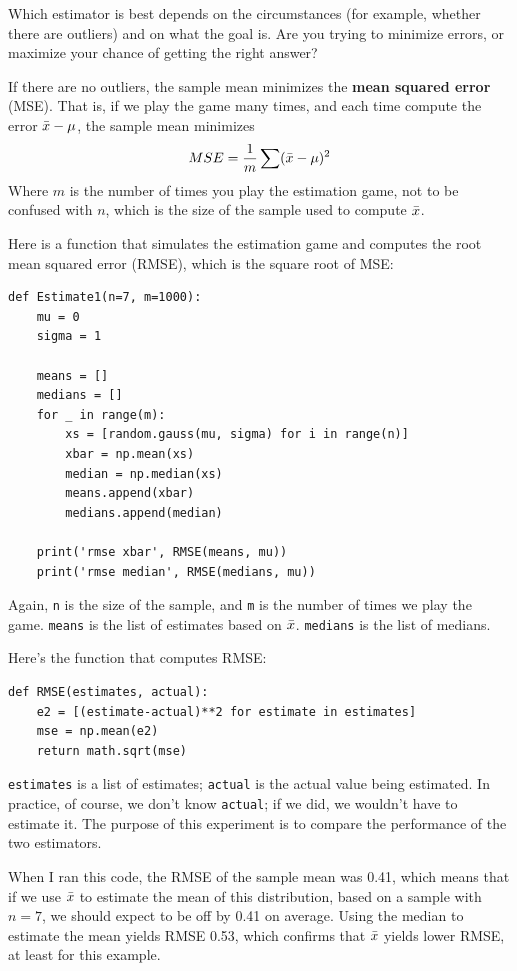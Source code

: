 \documentclass[12pt]{book}
\begin{document}
Which estimator is best depends on the circumstances (for example,
whether there are outliers) and on what the goal is.  Are you
trying to minimize errors, or maximize your chance of getting the
right answer?

If there are no outliers, the sample mean minimizes the {\bf mean squared
error} (MSE).  That is, if we play the game many times, and each time
compute the error $\bar{x} - \mu$, the sample mean minimizes
%
\[ MSE = \frac{1}{m} \sum (\bar{x} - \mu)^2 \]
%
Where $m$ is the number of times you play the estimation game, not
to be confused with $n$, which is the size of the sample used to
compute $\bar{x}$.

Here is a function that simulates the estimation game and computes
the root mean squared error (RMSE), which is the square root of
MSE:

\begin{verbatim}
def Estimate1(n=7, m=1000):
    mu = 0
    sigma = 1

    means = []
    medians = []
    for _ in range(m):
        xs = [random.gauss(mu, sigma) for i in range(n)]
        xbar = np.mean(xs)
        median = np.median(xs)
        means.append(xbar)
        medians.append(median)

    print('rmse xbar', RMSE(means, mu))
    print('rmse median', RMSE(medians, mu))
\end{verbatim}

Again, \verb"n" is the size of the sample, and \verb"m" is the
number of times we play the game.  \verb"means" is the list of
estimates based on $\bar{x}$.  \verb"medians" is the list of medians.

Here's the function that computes RMSE:

\begin{verbatim}
def RMSE(estimates, actual):
    e2 = [(estimate-actual)**2 for estimate in estimates]
    mse = np.mean(e2)
    return math.sqrt(mse)
\end{verbatim}

\verb"estimates" is a list of estimates; \verb"actual" is the
actual value being estimated.  In practice, of course, we don't
know \verb"actual"; if we did, we wouldn't have to estimate it.
The purpose of this experiment is to compare the performance of
the two estimators.

When I ran this code, the RMSE of the sample mean was 0.41, which
means that if we use $\bar{x}$ to estimate the mean of this
distribution, based on a sample with $n=7$, we should expect to be off
by 0.41 on average.  Using the median to estimate the mean yields
RMSE 0.53, which confirms that $\bar{x}$ yields lower RMSE, at least
for this example.
\end{document}
